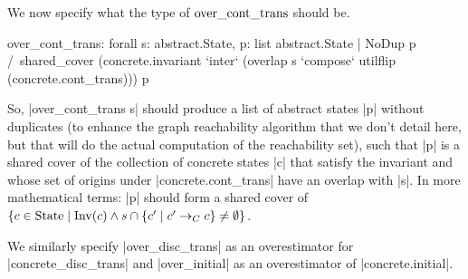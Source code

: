 \documentclass[runningheads]{llncs}
\newcommand{\weg}[1]{}
\newcommand{\State}{{\rm State}}
\newcommand{\Inv}{{\rm Inv}}
\newcommand{\contrans}{\rightarrow_C}
\newcommand{\overcontrans}{{\rm over\_cont\_trans}}
\begin{document}
We now specify what the type of $\overcontrans$ should be.
\begin{code}
over_cont_trans: forall s: abstract.State,
  { p: list abstract.State | NoDup p /\ shared_cover
    (concrete.invariant `inter` (overlap s `compose` utilflip (concrete.cont_trans))) p }
\end{code}
So, |over_cont_trans s| should produce a list of abstract states |p|
without duplicates (to enhance the graph reachability algorithm that
we don't detail here, but that will do the actual computation of the
reachability set), such that |p| is a shared cover of the collection
of concrete states |c| that satisfy the invariant and whose set of
origins under |concrete.cont_trans| have an overlap with |s|. In more
mathematical terms: |p| should form a shared cover of $\{ c \in \State
\mid \Inv(c) \wedge s\cap \{c' \mid c' \contrans c\} \neq \emptyset\}$.

\weg{
The |vm_compute| tactic we will ultimately use to run our program
tends to reduce terms in |Prop| a bit too eagerly, adversely affecting
performance. So to work around this, we have introduced a bit of laziness in
the form of a little ``unit abstraction'' that we will not detail here.
}

We similarly specify |over_disc_trans| as an overestimator for
|concrete_disc_trans| and |over_initial| as an overestimator of
|concrete.initial|. 
\end{document}
